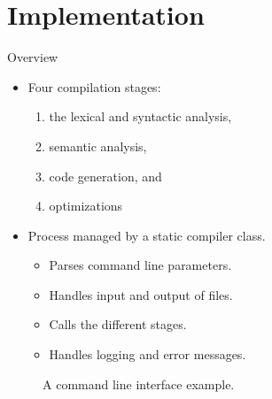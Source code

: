 \section{Implementation}
\begin{frame}{Overview}
    \begin{itemize}
        \item Four compilation stages:
        \begin{enumerate}
            \item the lexical and syntactic analysis,
            \item semantic analysis,
            \item code generation, and %
            \item optimizations
        \end{enumerate}
        \item Process managed by a static compiler class.
        \begin{itemize}
            \item Parses command line parameters.
            \item Handles input and output of files.
            \item Calls the different stages.
            \item Handles logging and error messages.
        \end{itemize}
    \end{itemize}    
    \begin{figure}[htp]
        \centering     
        
        \caption{A command line interface example.}
    \end{figure}
\end{frame}


